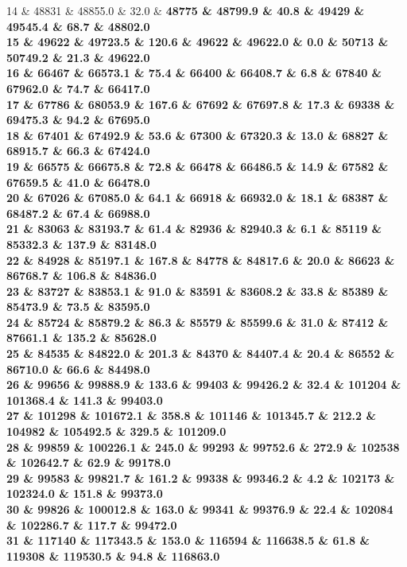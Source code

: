 14 \& 48831 \& 48855.0 \& 32.0 \& \bfseries 48775 \& 48799.9 \& 40.8 \& 49429 \& 49545.4 \& 68.7 \& 48802.0 \\
15 \& \bfseries 49622 \& 49723.5 \& 120.6 \& 49622 \& 49622.0 \& 0.0 \& 50713 \& 50749.2 \& 21.3 \& 49622.0 \\
16 \& 66467 \& 66573.1 \& 75.4 \& \bfseries 66400 \& 66408.7 \& 6.8 \& 67840 \& 67962.0 \& 74.7 \& 66417.0 \\
17 \& 67786 \& 68053.9 \& 167.6 \& \bfseries 67692 \& 67697.8 \& 17.3 \& 69338 \& 69475.3 \& 94.2 \& 67695.0 \\
18 \& 67401 \& 67492.9 \& 53.6 \& \bfseries 67300 \& 67320.3 \& 13.0 \& 68827 \& 68915.7 \& 66.3 \& 67424.0 \\
19 \& 66575 \& 66675.8 \& 72.8 \& \bfseries 66478 \& 66486.5 \& 14.9 \& 67582 \& 67659.5 \& 41.0 \& 66478.0 \\
20 \& 67026 \& 67085.0 \& 64.1 \& \bfseries 66918 \& 66932.0 \& 18.1 \& 68387 \& 68487.2 \& 67.4 \& 66988.0 \\
21 \& 83063 \& 83193.7 \& 61.4 \& \bfseries 82936 \& 82940.3 \& 6.1 \& 85119 \& 85332.3 \& 137.9 \& 83148.0 \\
22 \& 84928 \& 85197.1 \& 167.8 \& \bfseries 84778 \& 84817.6 \& 20.0 \& 86623 \& 86768.7 \& 106.8 \& 84836.0 \\
23 \& 83727 \& 83853.1 \& 91.0 \& \bfseries 83591 \& 83608.2 \& 33.8 \& 85389 \& 85473.9 \& 73.5 \& 83595.0 \\
24 \& 85724 \& 85879.2 \& 86.3 \& \bfseries 85579 \& 85599.6 \& 31.0 \& 87412 \& 87661.1 \& 135.2 \& 85628.0 \\
25 \& 84535 \& 84822.0 \& 201.3 \& \bfseries 84370 \& 84407.4 \& 20.4 \& 86552 \& 86710.0 \& 66.6 \& 84498.0 \\
26 \& 99656 \& 99888.9 \& 133.6 \& \bfseries 99403 \& 99426.2 \& 32.4 \& 101204 \& 101368.4 \& 141.3 \& 99403.0 \\
27 \& 101298 \& 101672.1 \& 358.8 \& \bfseries 101146 \& 101345.7 \& 212.2 \& 104982 \& 105492.5 \& 329.5 \& 101209.0 \\
28 \& 99859 \& 100226.1 \& 245.0 \& 99293 \& 99752.6 \& 272.9 \& 102538 \& 102642.7 \& 62.9 \& \bfseries 99178.0 \\
29 \& 99583 \& 99821.7 \& 161.2 \& \bfseries 99338 \& 99346.2 \& 4.2 \& 102173 \& 102324.0 \& 151.8 \& 99373.0 \\
30 \& 99826 \& 100012.8 \& 163.0 \& \bfseries 99341 \& 99376.9 \& 22.4 \& 102084 \& 102286.7 \& 117.7 \& 99472.0 \\
31 \& 117140 \& 117343.5 \& 153.0 \& \bfseries 116594 \& 116638.5 \& 61.8 \& 119308 \& 119530.5 \& 94.8 \& 116863.0 \\
